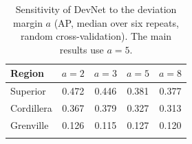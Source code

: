 \documentclass[pdflatex,sn-apa]{sn-jnl}
\begin{document}
\begin{appendices}
\begin{table}[!h]
\caption{Sensitivity of DevNet to the deviation margin $a$ (AP, median over six repeats, random cross-validation). The main results use $a = 5$.}\label{tab:margin}
\footnotesize
\begin{tabular*}{0.7\textwidth}{@{\extracolsep\fill}lcccc}
\toprule
Region & $a = 2$ & $a = 3$ & $a = 5$ & $a = 8$ \\
\midrule
Superior & 0.472 & 0.446 & 0.381 & 0.377 \\
Cordillera & 0.367 & 0.379 & 0.327 & 0.313 \\
Grenville & 0.126 & 0.115 & 0.127 & 0.120 \\
\botrule
\end{tabular*}
\end{table}

\end{appendices}

\clearpage


\end{document}
